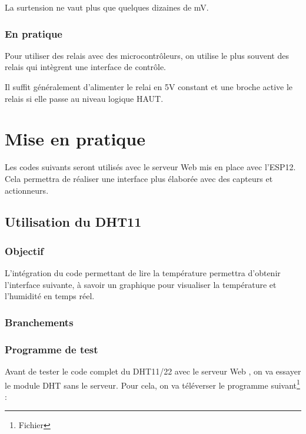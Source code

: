 La surtension ne vaut plus que quelques dizaines de mV.


\subsection{En pratique}

Pour utiliser des relais avec des microcontrôleurs, on utilise le plus souvent des relais qui intègrent une interface de contrôle.\\


Il suffit généralement d'alimenter le relai en 5V constant et une broche active le relais si elle passe au niveau logique HAUT.\chapter{Mise en pratique}

Les codes suivants seront utilisés avec le serveur Web mis en place avec l'ESP12.\\
Cela permettra de réaliser une interface plus élaborée avec des capteurs et actionneurs.

\section{Utilisation du DHT11}


\subsection{Objectif}
L'intégration du code permettant de lire la température permettra d'obtenir l'interface suivante, à savoir un graphique pour 
visualiser la température et l'humidité en temps réel.


\subsection{Branchements}


\subsection{Programme de test}

Avant de tester le code complet du DHT11/22 avec le serveur Web , on va essayer le module DHT sans le serveur. 
Pour cela, on va téléverser le programme suivant\footnote{Fichier } :

